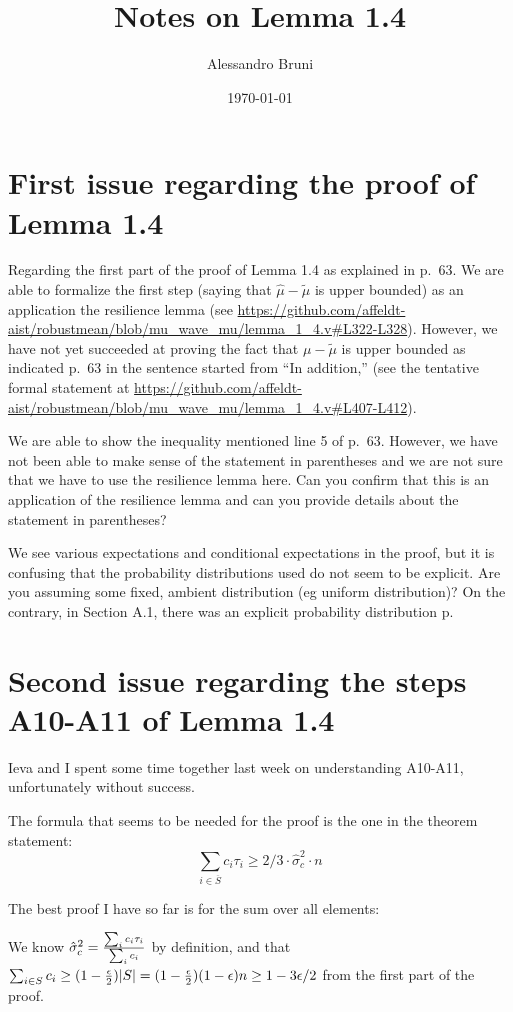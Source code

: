 \documentclass[11pt]{article}
\author{Alessandro Bruni}
\date{\today}
\title{Notes on Lemma 1.4}
\begin{document}
\maketitle

\section{First issue regarding the proof of Lemma 1.4}

Regarding the first part of the proof of Lemma 1.4 as explained in p.\ 63.
We are able to formalize the first step (saying that $\hat\mu - \widetilde{\mu}$ is
upper bounded) as an application the resilience lemma (see
\url{https://github.com/affeldt-aist/robustmean/blob/mu_wave_mu/lemma_1_4.v#L322-L328}).
However, we have not yet succeeded at proving the fact that $\mu - \widetilde{\mu}$
is upper bounded as indicated p.\ 63 in the sentence started from ``In addition,''
(see the tentative formal statement at
\url{https://github.com/affeldt-aist/robustmean/blob/mu_wave_mu/lemma_1_4.v#L407-L412}).

We are able to show the inequality mentioned line 5 of p.\ 63. However,
we have not been able to make sense of the statement in parentheses and we are
not sure that we have to use the resilience lemma here.
Can you confirm that this is an application of the resilience lemma
and can you provide details about the statement in parentheses?

We see various expectations and conditional expectations in the proof, but it is confusing
that the probability distributions used do not seem to be explicit.
Are you assuming some fixed, ambient distribution (eg uniform distribution)?
On the contrary, in Section A.1, there was an explicit probability distribution p.

\section{Second issue regarding the steps A10-A11 of Lemma 1.4}

Ieva and I spent some time together last week on understanding A10-A11, unfortunately without success.

The formula that seems to be needed for the proof is the one in the theorem statement:
\[ \sum_{i \in \overline S} c_i \tau_i \ge 2/3 \cdot \hat\sigma_c^2 \cdot n \]

The best proof I have so far is for the sum over all elements:

We know \(\hat\sigma_c^2 = {\sum_i c_i \tau_i \over \sum_i c_i}\) by definition, and that  \(\sum_{i \in S} c_i \ge (1-{\epsilon\over 2})|S| = (1-{\epsilon\over 2})(1-\epsilon)n \ge 1-3\epsilon/2\) from the first part of the proof.
\end{document}
